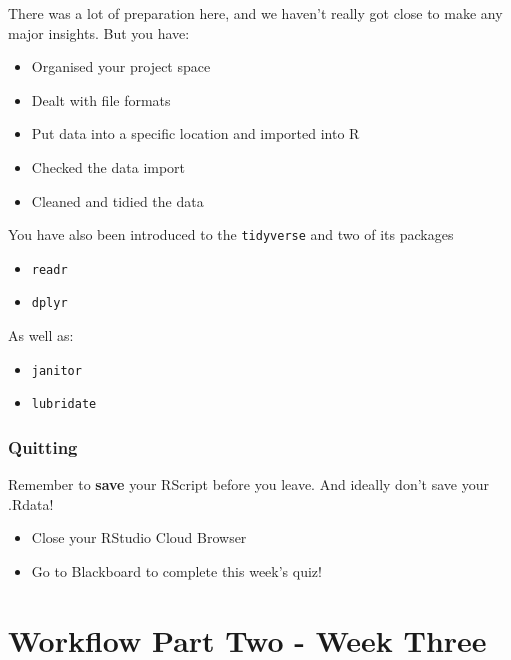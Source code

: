 \documentclass[
]{book}
\makeatletter
\newenvironment{kframe}{%
\medskip{}
\setlength{\fboxsep}{.8em}
 \def\at@end@of@kframe{}%
 \ifinner\ifhmode%
  \def\at@end@of@kframe{\end{minipage}}%
  \begin{minipage}{\columnwidth}%
 \fi\fi%
 \def\FrameCommand##1{\hskip\@totalleftmargin \hskip-\fboxsep
 \colorbox{shadecolor}{##1}\hskip-\fboxsep
     \hskip-\linewidth \hskip-\@totalleftmargin \hskip\columnwidth}%
 \MakeFramed {\advance\hsize-\width
   \@totalleftmargin\z@ \linewidth\hsize
   \@setminipage}}%
 {\par\unskip\endMakeFramed%
 \at@end@of@kframe}
\newenvironment{block}[1]
  {
  \begin{itemize}
  \renewcommand{\labelitemi}{
    \raisebox{-.7\height}[0pt][0pt]{
      {\setkeys{Gin}{width=3em,keepaspectratio}\texttt{[image: images/\#1]}}
    }
  }
  \setlength{\fboxsep}{1em}
  \begin{kframe}
  \item
  }
  {
  \end{kframe}
  \end{itemize}
  }
\newenvironment{rmdwarning}
  {\begin{block}{warning}}
  {\end{block}}
\makeatother
\begin{document}
There was a lot of preparation here, and we haven't really got close to make any major insights. But you have:

\begin{itemize}
\item
  Organised your project space
\item
  Dealt with file formats
\item
  Put data into a specific location and imported into R
\item
  Checked the data import
\item
  Cleaned and tidied the data
\end{itemize}

You have also been introduced to the \texttt{tidyverse} and two of its packages

\begin{itemize}
\item
  \texttt{readr} \citet{R-readr}
\item
  \texttt{dplyr} \citet{R-dplyr}
\end{itemize}

As well as:

\begin{itemize}
\item
  \texttt{janitor} \citet{R-janitor}
\item
  \texttt{lubridate} \citet{R-lubridate}
\end{itemize}

\hypertarget{quitting-1}{%
\subsection{Quitting}\label{quitting-1}}

\begin{rmdwarning}
Remember to \textbf{save} your RScript before you leave. And ideally
don't save your .Rdata!
\end{rmdwarning}

\begin{itemize}
\item
  Close your RStudio Cloud Browser
\item
  Go to Blackboard to complete this week's quiz!
\end{itemize}

\hypertarget{workflow-part-two---week-three}{%
\chapter{Workflow Part Two - Week Three}\label{workflow-part-two---week-three}}
\end{document}
